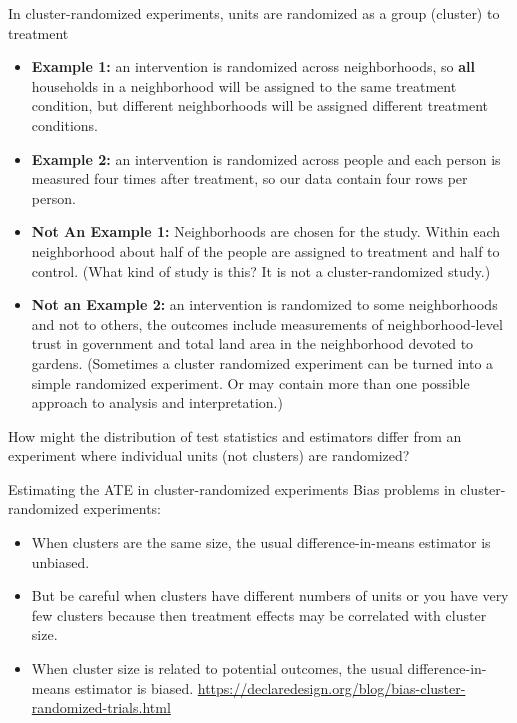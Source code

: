 \documentclass[
  ignorenonframetext,
]{beamer}
\providecommand{\tightlist}{%
  \setlength{\itemsep}{0pt}\setlength{\parskip}{0pt}}
\begin{document}
\begin{frame}[allowframebreaks]{In cluster-randomized experiments, units
are randomized as a group (cluster) to treatment}
\protect\hypertarget{in-cluster-randomized-experiments-units-are-randomized-as-a-group-cluster-to-treatment}{}
\begin{itemize}
\tightlist
\item
  \textbf{Example 1:} an intervention is randomized across
  neighborhoods, so \textbf{all} households in a neighborhood will be
  assigned to the same treatment condition, but different neighborhoods
  will be assigned different treatment conditions.
\item
  \textbf{Example 2:} an intervention is randomized across people and
  each person is measured four times after treatment, so our data
  contain four rows per person.
\item
  \textbf{Not An Example 1:} Neighborhoods are chosen for the study.
  Within each neighborhood about half of the people are assigned to
  treatment and half to control. (What kind of study is this? It is not
  a cluster-randomized study.)
\item
  \textbf{Not an Example 2:} an intervention is randomized to some
  neighborhoods and not to others, the outcomes include measurements of
  neighborhood-level trust in government and total land area in the
  neighborhood devoted to gardens. (Sometimes a cluster randomized
  experiment can be turned into a simple randomized experiment. Or may
  contain more than one possible approach to analysis and
  interpretation.)
\end{itemize}

How might the distribution of test statistics and estimators differ from
an experiment where individual units (not clusters) are randomized?
\end{frame}

\begin{frame}{Estimating the ATE in cluster-randomized experiments}
\protect\hypertarget{estimating-the-ate-in-cluster-randomized-experiments}{}
Bias problems in cluster-randomized experiments:

\begin{itemize}
\item
  When clusters are the same size, the usual difference-in-means
  estimator is unbiased.
\item
  But be careful when clusters have different numbers of units or you
  have very few clusters because then treatment effects may be
  correlated with cluster size.
\item
  When cluster size is related to potential outcomes, the usual
  difference-in-means estimator is biased.
  \url{https://declaredesign.org/blog/bias-cluster-randomized-trials.html}
\end{itemize}
\end{frame}
\end{document}
